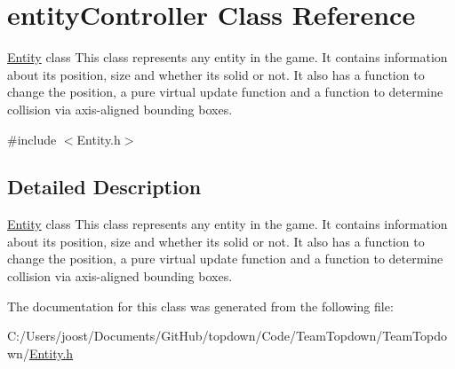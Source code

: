 \hypertarget{classentity_controller}{}\section{entity\+Controller Class Reference}
\label{classentity_controller}


\hyperlink{class_entity}{Entity} class This class represents any entity in the game. It contains information about its position, size and whether it\textquotesingle{}s solid or not. It also has a function to change the position, a pure virtual update function and a function to determine collision via axis-\/aligned bounding boxes.  




{\ttfamily \#include $<$Entity.\+h$>$}



\subsection{Detailed Description}
\hyperlink{class_entity}{Entity} class This class represents any entity in the game. It contains information about its position, size and whether it\textquotesingle{}s solid or not. It also has a function to change the position, a pure virtual update function and a function to determine collision via axis-\/aligned bounding boxes. 

The documentation for this class was generated from the following file\+:\begin{DoxyCompactItemize}
\item 
C\+:/\+Users/joost/\+Documents/\+Git\+Hub/topdown/\+Code/\+Team\+Topdown/\+Team\+Topdown/\hyperlink{_entity_8h}{Entity.\+h}\end{DoxyCompactItemize}
